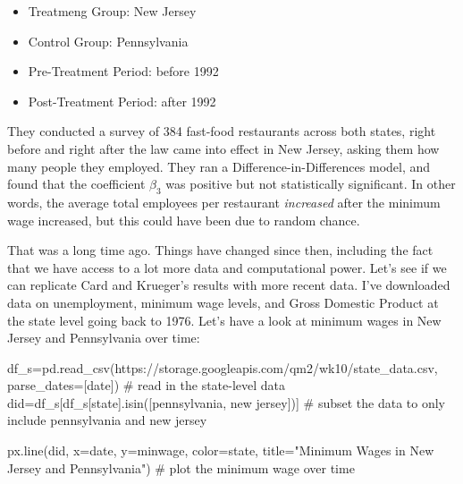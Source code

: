 \documentclass[
  letterpaper,
  DIV=11,
  numbers=noendperiod]{scrreprt}
\newenvironment{Shaded}{\begin{snugshade}}{\end{snugshade}}
\newcommand{\CommentTok}[1]{\textcolor[rgb]{0.37,0.37,0.37}{#1}}
\newcommand{\NormalTok}[1]{\textcolor[rgb]{0.00,0.23,0.31}{#1}}
\newcommand{\OperatorTok}[1]{\textcolor[rgb]{0.37,0.37,0.37}{#1}}
\newcommand{\StringTok}[1]{\textcolor[rgb]{0.13,0.47,0.30}{#1}}
\providecommand{\tightlist}{%
  \setlength{\itemsep}{0pt}\setlength{\parskip}{0pt}}\usepackage{longtable,booktabs,array}
\begin{document}
\begin{itemize}
\tightlist
\item
  Treatmeng Group: New Jersey
\item
  Control Group: Pennsylvania
\item
  Pre-Treatment Period: before 1992
\item
  Post-Treatment Period: after 1992
\end{itemize}

They conducted a survey of 384 fast-food restaurants across both states,
right before and right after the law came into effect in New Jersey,
asking them how many people they employed. They ran a
Difference-in-Differences model, and found that the coefficient
\(\beta_3\) was positive but not statistically significant. In other
words, the average total employees per restaurant \emph{increased} after
the minimum wage increased, but this could have been due to random
chance.

That was a long time ago. Things have changed since then, including the
fact that we have access to a lot more data and computational power.
Let's see if we can replicate Card and Krueger's results with more
recent data. I've downloaded data on unemployment, minimum wage levels,
and Gross Domestic Product at the state level going back to 1976. Let's
have a look at minimum wages in New Jersey and Pennsylvania over time:

\begin{Shaded}
\begin{Highlighting}[]
\NormalTok{df\_s}\OperatorTok{=}\NormalTok{pd.read\_csv(}\StringTok{\textquotesingle{}https://storage.googleapis.com/qm2/wk10/state\_data.csv\textquotesingle{}}\NormalTok{, parse\_dates}\OperatorTok{=}\NormalTok{[}\StringTok{\textquotesingle{}date\textquotesingle{}}\NormalTok{]) }\CommentTok{\# read in the state{-}level data}
\NormalTok{did}\OperatorTok{=}\NormalTok{df\_s[df\_s[}\StringTok{\textquotesingle{}state\textquotesingle{}}\NormalTok{].isin([}\StringTok{\textquotesingle{}pennsylvania\textquotesingle{}}\NormalTok{, }\StringTok{\textquotesingle{}new jersey\textquotesingle{}}\NormalTok{])] }\CommentTok{\# subset the data to only include pennsylvania and new jersey}

\NormalTok{px.line(did, x}\OperatorTok{=}\StringTok{\textquotesingle{}date\textquotesingle{}}\NormalTok{, y}\OperatorTok{=}\StringTok{\textquotesingle{}minwage\textquotesingle{}}\NormalTok{, color}\OperatorTok{=}\StringTok{\textquotesingle{}state\textquotesingle{}}\NormalTok{, title}\OperatorTok{=}\StringTok{"Minimum Wages in New Jersey and Pennsylvania"}\NormalTok{) }\CommentTok{\# plot the minimum wage over time}
\end{Highlighting}
\end{Shaded}
\end{document}
